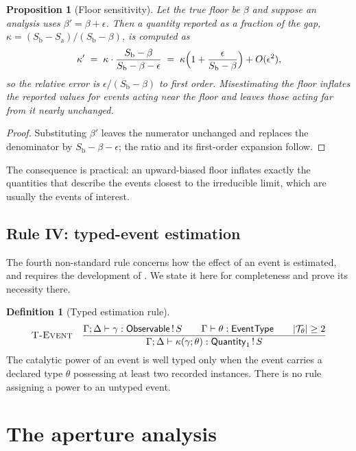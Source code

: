 \documentclass[11pt,twocolumn,a4paper]{article}
\theoremstyle{thmstyle}
\newtheorem{proposition}[theorem]{Proposition}
\theoremstyle{definition}
\newtheorem{definition}[theorem]{Definition}
\theoremstyle{remark}
\newcommand{\flo}{\beta}
\newcommand{\kap}{\kappa}
\newcommand{\Env}{\Gamma}
\newcommand{\abs}[1]{\lvert#1\rvert}
\newcommand{\Obs}{\textsf{Observable}}
\begin{document}
\begin{proposition}[Floor sensitivity]
\label{prop:floor-sensitivity}
Let the true floor be $\flo$ and suppose an analysis uses
$\flo'=\flo+\epsilon$. Then a quantity reported as a fraction of the gap,
$\kap=(S_{\mathrm{b}}-S_{\mathrm{a}})/(S_{\mathrm{b}}-\flo)$, is computed as
\[
\kap' \;=\; \kap\cdot\frac{S_{\mathrm{b}}-\flo}{S_{\mathrm{b}}-\flo-\epsilon}
\;=\;\kap\Bigl(1+\frac{\epsilon}{S_{\mathrm{b}}-\flo}\Bigr)+O(\epsilon^{2}),
\]
so the relative error is $\epsilon/(S_{\mathrm{b}}-\flo)$ to first order.
Misestimating the floor inflates the reported values for events acting near
the floor and leaves those acting far from it nearly unchanged.
\end{proposition}

\begin{proof}
Substituting $\flo'$ leaves the numerator unchanged and replaces the
denominator by $S_{\mathrm{b}}-\flo-\epsilon$; the ratio and its first-order
expansion follow.
\end{proof}

The consequence is practical: an upward-biased floor inflates exactly the
quantities that describe the events closest to the irreducible limit, which
are usually the events of interest.

\subsection{Rule IV: typed-event estimation}

The fourth non-standard rule concerns how the effect of an event is estimated,
and requires the development of . We state it here for
completeness and prove its necessity there.

\begin{definition}[Typed estimation rule]
\label{def:typed-rule}
\[
\textsc{T-Event}\quad
\frac{\Env;\Delta\vdash \gamma:\Obs\,!\,S\qquad
      \Env\vdash \theta:\textsf{EventType}\qquad
      \abs{\mathcal{T}_{\theta}}\ge2}
     {\Env;\Delta\vdash \kap(\gamma;\theta):\textsf{Quantity}_{1}\,!\,S}
\]
The catalytic power of an event is well typed only when the event carries a
declared type $\theta$ possessing at least two recorded instances. There is no
rule assigning a power to an untyped event.
\end{definition}

\section{The aperture analysis}
\label{sec:aperture}
\end{document}
